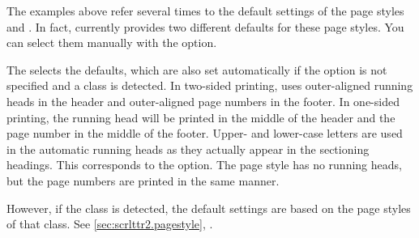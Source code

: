 \begin{Declaration}
\end{Declaration}
%
%
The examples above refer several times to the default settings of the page
styles 
and %
. In fact, 
currently provides two different defaults for these page styles. You can
select them manually with the  option.

The 
 selects the defaults, which are also set automatically if the
option is not specified and a \KOMAScript{} class is detected. In two-sided
printing,  uses outer-aligned
running heads in the header and outer-aligned page numbers in the footer.
In one-sided printing, the running head will be printed in the
middle of the header and the page number in the middle of the footer. Upper-
and lower-case letters are used in the automatic running heads as they
actually appear in the sectioning headings. This corresponds to the
%
 option. The
 page style has no running
heads, but the page numbers are printed in the same manner.

However, if the \hyperref[cha:scrlttr2]{}%
%
 class is detected, the default settings are based on the
page styles of that class. See \autoref{sec:scrlttr2.pagestyle}, 
.

